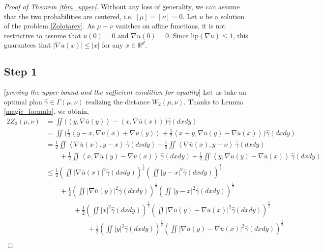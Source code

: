 \documentclass[11pt,reqno]{amsart}
\theoremstyle{definition}
\numberwithin{equation}{section}
\newcommand{\R}{\mathbb{R}}
\newcommand{\Rd}{{\R^d}}
\newcommand{\ov}{\overline}
\newcommand{\pairing}[1]{{\left \langle #1 \right \rangle}}
\newcommand{\abs}[1]{{\left \lvert #1 \right \rvert}}
\begin{document}
\begin{proof}[Proof of Theorem \ref{thm_upper}] Without any loss of generality, we can assume that the two probabilities are centered, i.e. $[\mu] = [\nu] = 0$. Let $\ov{u}$ be a solution of the problem \eqref{Zolotarev}. As  $\mu-\nu$ vanishes on affine functions, it is not restrictive to assume that $\ov u(0)=0$ and $\nabla \ov{u}(0) = 0$. Since $\mathrm{lip}(\nabla \ov{u}) \leq 1$, this guarantees that $\abs{\nabla \ov{u}(x)} \leq \abs{x}$ for any $x \in \Rd$.

\subsection*{Step 1}[\emph{proving the upper bound and the sufficient condition for equality}]
Let us  take an optimal plan $\hat{\gamma}\in \Gamma(\mu,\nu)$ realizing the distance $W_2(\mu,\nu)$. Thanks to Lemma \ref{magic_formula},  we obtain,
\begin{align}
	\label{integral_chain}
	2 Z_2(\mu,\nu) & =\iint \Big( \pairing{y,\nabla \ov{u}(y)} - \pairing{x,\nabla \ov{u}(x)} \Big) \hat{\gamma}(dxdy) \\
	\nonumber
	& =\iint \Big(\frac{1}{2} \pairing{y-x,\nabla \ov{u}(x) + \nabla \ov{u}(y)} + \frac{1}{2} \pairing{x+y,\nabla \ov{u}(y) - \nabla \ov{u}(x)}\Big) \hat{\gamma}(dxdy) \\
	\nonumber
	& =\frac{1}{2}\iint  \pairing{\nabla \ov{u}(x),y-x}  \, \hat{\gamma}(dxdy) + \frac{1}{2}\iint  \pairing{\nabla \ov{u}(x),y-x} \, \hat{\gamma}(dxdy) \\
	\nonumber
	& \qquad + \frac{1}{2}\iint  \pairing{x,\nabla \ov{u}(y) - \nabla \ov{u}(x)} \, \hat{\gamma}(dxdy) + \frac{1}{2}\iint  \pairing{y,\nabla \ov{u}(y) - \nabla \ov{u}(x)} \, \hat{\gamma}(dxdy)   \\
	\label{ineq1}
	& \leq \frac{1}{2} \left(\iint \abs{\nabla \ov{u}(x)}^2 \hat\gamma(dxdy) \right)^{\frac{1}{2}} \left(\iint \abs{y-x}^2 \hat\gamma(dxdy) \right)^{\frac{1}{2}} \\
	\nonumber
	& \qquad + \frac{1}{2} \left(\iint \abs{\nabla \ov{u}(y)}^2 \hat\gamma(dxdy) \right)^{\frac{1}{2}} \left(\iint \abs{y-x}^2 \hat\gamma(dxdy) \right)^{\frac{1}{2}} \\
	\nonumber
	& \qquad \qquad  + \frac{1}{2} \left(\iint \abs{x}^2 \hat\gamma(dxdy) \right)^{\frac{1}{2}} \left(\iint \abs{\nabla \ov{u}(y) - \nabla \ov{u}(x)}^2 \hat\gamma(dxdy) \right)^{\frac{1}{2}} \\
	\nonumber
	& \qquad \qquad \qquad  + \frac{1}{2} \left(\iint \abs{y}^2 \hat\gamma(dxdy) \right)^{\frac{1}{2}} \left(\iint \abs{\nabla \ov{u}(y) - \nabla \ov{u}(x)}^2 \hat\gamma(dxdy) \right)^{\frac{1}{2}} \\

\end{align}
\end{proof}
\end{document}

